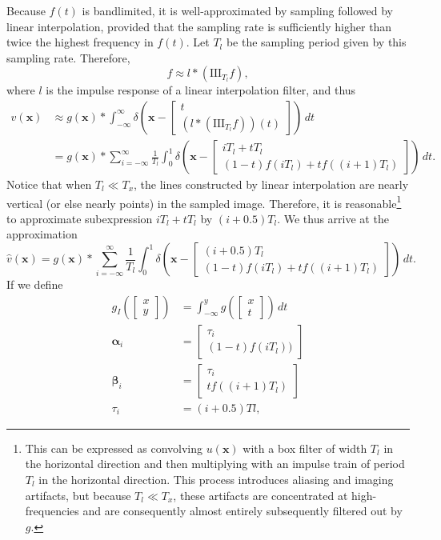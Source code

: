 \documentclass{article}
\let\V\boldsymbol
\begin{document}
Because $f(t)$ is bandlimited, it is well-approximated by sampling followed by linear interpolation, provided that the sampling rate is sufficiently higher than twice the highest frequency in $f(t)$.  Let $T_l$ be the sampling period given by this sampling rate.  Therefore,
\[
f \approx l*(\mathrm{III}_{T_l} f),
\]
where $l$ is the impulse response of a linear interpolation filter, and thus
\begin{align*}
v(\V x) &\approx g(\V x)*\int_{-\infty}^{\infty} \delta\left(\V x - \begin{bmatrix}t\\(l*(\mathrm{III}_{T_l} f))(t)\end{bmatrix}\right)\,dt\\
&= g(\V x)*\sum_{i=-\infty}^{\infty}\frac{1}{T_l}\int_{0}^{1}\delta\left(\V x - \begin{bmatrix}iT_l + tT_l\\(1 - t)f(iT_l) + tf((i+1)T_l)\end{bmatrix}\right)\,dt.
\end{align*}
Notice that when $T_l \ll T_x$, the lines constructed by linear interpolation are nearly vertical (or else nearly points) in the sampled image.  Therefore, it is reasonable\footnote{This can be expressed as convolving $u(\V x)$ with a box filter of width $T_l$ in the horizontal direction and then multiplying with an impulse train of period $T_l$ in the horizontal direction.  This process introduces aliasing and imaging artifacts, but because $T_l \ll T_x$, these artifacts are concentrated at high-frequencies and are consequently almost entirely subsequently filtered out by $g$.} to approximate subexpression $iT_l + tT_l$ by $(i + 0.5)T_l$.  We thus arrive at the approximation
\[
\hat v(\V x) = g(\V x)*\sum_{i=-\infty}^{\infty}\frac{1}{T_l}\int_{0}^{1}\delta\left(\V x - \begin{bmatrix}(i + 0.5)T_l\\(1 - t)f(iT_l) + tf((i+1)T_l)\end{bmatrix}\right)\,dt.
\]
If we define
\begin{align*}
g_I\left(\begin{bmatrix}x\\y\end{bmatrix}\right) &= \int_{-\infty}^y g\left(\begin{bmatrix}x\\t\end{bmatrix}\right)\,dt\\
\V \alpha_i &= \begin{bmatrix}\tau_i\\(1 - t)f(iT_l))\end{bmatrix}\\
\V \beta_i &= \begin{bmatrix}\tau_i\\tf((i+1)T_l)\end{bmatrix}\\
\tau_i &= (i+0.5)Tl,
\end{align*}
\end{document}
